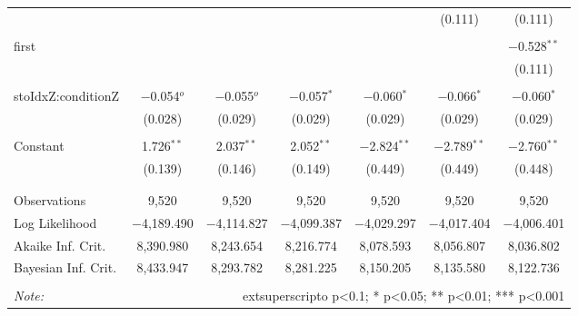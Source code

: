 \begin{table}[!htbp]
\begin{tabular}{@{\extracolsep{5pt}}lcccccc}
  &  &  &  &  & (0.111) & (0.111) \\ 
  & & & & & & \\ 
 first &  &  &  &  &  & $-$0.528$^{**}$ \\ 
  &  &  &  &  &  & (0.111) \\ 
  & & & & & & \\ 
 stoIdxZ:conditionZ & $-$0.054$^{o}$ & $-$0.055$^{o}$ & $-$0.057$^{*}$ & $-$0.060$^{*}$ & $-$0.066$^{*}$ & $-$0.060$^{*}$ \\ 
  & (0.028) & (0.029) & (0.029) & (0.029) & (0.029) & (0.029) \\ 
  & & & & & & \\ 
 Constant & 1.726$^{**}$ & 2.037$^{**}$ & 2.052$^{**}$ & $-$2.824$^{**}$ & $-$2.789$^{**}$ & $-$2.760$^{**}$ \\ 
  & (0.139) & (0.146) & (0.149) & (0.449) & (0.449) & (0.448) \\ 
  & & & & & & \\ 
\hline \\[-1.8ex] 
Observations & 9,520 & 9,520 & 9,520 & 9,520 & 9,520 & 9,520 \\ 
Log Likelihood & $-$4,189.490 & $-$4,114.827 & $-$4,099.387 & $-$4,029.297 & $-$4,017.404 & $-$4,006.401 \\ 
Akaike Inf. Crit. & 8,390.980 & 8,243.654 & 8,216.774 & 8,078.593 & 8,056.807 & 8,036.802 \\ 
Bayesian Inf. Crit. & 8,433.947 & 8,293.782 & 8,281.225 & 8,150.205 & 8,135.580 & 8,122.736 \\ 
\hline 
\hline \\[-1.8ex] 
\textit{Note:}  & \multicolumn{6}{r}{	extsuperscript{o} p<0.1; * p<0.05; ** p<0.01; *** p<0.001} \\ 
\end{tabular} 
\end{table} 
